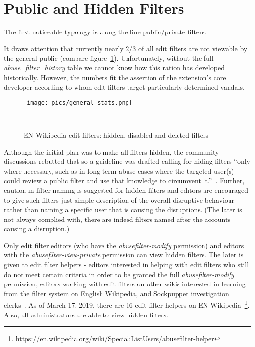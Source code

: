 
\section{Public and Hidden Filters}

The first noticeable typology is along the line public/private filters.

It draws attention that currently nearly $2/3$ of all edit filters are not viewable by the general public (compare figure~\ref{fig:general-stats}).
Unfortunately, without the full \emph{abuse\_filter\_history} table we cannot know how this ration has developed historically.
However, the numbers fit the assertion of the extension's core developer according to whom edit filters target particularly determined vandals.

\begin{figure}
\centering
  \texttt{[image: pics/general\_stats.png]}
  \caption{EN Wikipedia edit filters: hidden, disabled and deleted filters}~\label{fig:general-stats}
\end{figure}

Although the initial plan was to make all filters hidden, the community discussions rebutted that so a guideline was drafted calling for
hiding filters ``only where necessary, such as in long-term abuse cases where the targeted user(s) could review a public filter and use that knowledge to circumvent it.''~\cite{Wikipedia:EditFilter}.
Further, caution in filter naming is suggested for hidden filters and editors are encouraged to give such filters just simple description of the overall disruptive behaviour rather than naming a specific user that is causing the disruptions.
(The later is not always complied with, there are indeed filters named after the accounts causing a disruption.)

Only edit filter editors (who have the \emph{abusefilter-modify} permission) and editors with the \emph{abusefilter-view-private} permission can view hidden filters.
The later is given to edit filter helpers - editors interested in helping with edit filters who still do not meet certain criteria in order to be granted the full \emph{abusefilter-modify} permission, editors working with edit filters on other wikis interested in learning from the filter system on English Wikipedia, and Sockpuppet investigation clerks~\cite{Wikipedia:EditFilterHelper}.
As of March 17, 2019, there are 16 edit filter helpers on EN Wikipedia~\footnote{\url{https://en.wikipedia.org/wiki/Special:ListUsers/abusefilter-helper}}.
Also, all administrators are able to view hidden filters.

